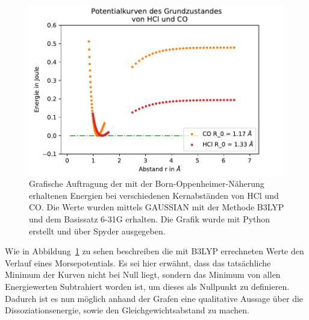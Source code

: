 
\begin{figure}[ht]
	\centering	
	\begin{minipage}{0.5\textwidth}
	\includegraphics[width=\columnwidth]{Bilder/b3lypzusammen}
	\end{minipage}
	
	
	\caption{Grafische Auftragung der mit der Born-Oppenheimer-Näherung erhaltenen Energien bei verschiedenen Kernabständen von HCl und CO. Die Werte wurden mittels GAUSSIAN mit der Methode B3LYP und dem Basissatz 6-31G erhalten. Die Grafik wurde mit Python erstellt und über Spyder ausgegeben.}
	
	
	\label{b3lypzusammen}
\end{figure}


Wie in Abbildung~\ref{b3lypzusammen} zu sehen beschreiben die mit B3LYP errechneten Werte den Verlauf eines Morsepotentials. Es sei hier erwähnt, dass das tatsächliche Minimum der Kurven nicht bei Null liegt, sondern das Minimum von allen Energiewerten Subtrahiert worden ist, um dieses als Nullpunkt zu definieren. Dadurch ist es nun möglich anhand der Grafen eine qualitative Aussage über die Dissoziationsenergie, sowie den Gleichgewichtsabstand zu machen.


  

